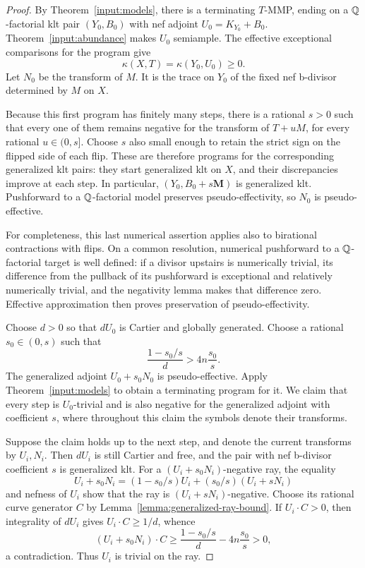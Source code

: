 \begin{proof}
By Theorem~\ref{input:models}, there is a terminating $T$-MMP, ending
on a $\mathbb Q$-factorial klt pair $(Y_0,B_0)$ with nef adjoint
$U_0=K_{Y_0}+B_0$.  Theorem~\ref{input:abundance} makes $U_0$
semiample.  The effective exceptional comparisons for the program
give
\[
                         \kappa(X,T)=\kappa(Y_0,U_0)\geq0.
\]
Let $N_0$ be the transform of $M$.  It is the trace on $Y_0$ of the
fixed nef b-divisor determined by $M$ on $X$.

Because this first program has finitely many steps, there is a
rational $s>0$ such that every one of them remains negative for the
transform of $T+uM$, for every rational $u\in(0,s]$.  Choose $s$ also
small enough to retain the strict sign on the flipped side of each
flip.  These are therefore programs for the corresponding generalized
klt pairs: they start generalized klt on $X$, and their discrepancies
improve at each step.  In particular, $(Y_0,B_0+s\mathbf M)$ is
generalized klt.  Pushforward to a $\mathbb Q$-factorial model preserves
pseudo-effectivity, so $N_0$ is pseudo-effective.

For completeness, this last numerical assertion applies also to
birational contractions with flips.  On a common resolution, numerical
pushforward to a $\mathbb Q$-factorial target is well defined: if a divisor
upstairs is numerically trivial, its difference from the pullback of
its pushforward is exceptional and relatively numerically trivial,
and the negativity lemma makes that difference zero.  Effective
approximation then proves preservation of pseudo-effectivity.

Choose $d>0$ so that $dU_0$ is Cartier and globally generated.  Choose
a rational $s_0\in(0,s)$ such that
\begin{equation}\label{eq:small-nef-coefficient}
                 \frac{1-s_0/s}{d}>4n\frac{s_0}{s}.
\end{equation}
The generalized adjoint $U_0+s_0N_0$ is pseudo-effective.  Apply
Theorem~\ref{input:models} to obtain a terminating program for it.
We claim that every step is $U_0$-trivial and is also negative for the
generalized adjoint with coefficient $s$, where throughout this
claim the symbols denote their transforms.

Suppose the claim holds up to the next step, and denote the current
transforms by $U_i,N_i$.  Then $dU_i$ is still Cartier and free, and
the pair with nef b-divisor coefficient $s$ is generalized klt.
For a $(U_i+s_0N_i)$-negative ray, the equality
\[
 U_i+s_0N_i=(1-s_0/s)U_i+(s_0/s)(U_i+sN_i)
\]
and nefness of $U_i$ show that the ray is $(U_i+sN_i)$-negative.
Choose its rational curve generator $C$ by
Lemma~\ref{lemma:generalized-ray-bound}.  If $U_i\cdot C>0$, then
integrality of $dU_i$ gives $U_i\cdot C\geq1/d$, whence
\[
 (U_i+s_0N_i)\cdot C
 \geq\frac{1-s_0/s}{d}-4n\frac{s_0}{s}>0,
\]
a contradiction.  Thus $U_i$ is trivial on the ray.


\end{proof}
